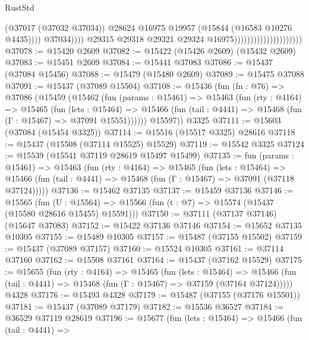\begin{lexlean}{RustStd}
\begin{coremodule}
                                                          (@37017 (@37032 @37034))
                                                          @28624
                                                          @16975
                                                          @19957
                                                          (@15844 (@16583 @10276 @4435))))
                                                      @37034))))
                                              @29315
                                              @29318
                                              @29321
                                              @29324
                                              @16975)))))))))))))))))))))
@37078 := @15420 @2609
@37082 := @15422 (@15426 @2609) (@15432 @2609)
@37083 := @15451 @2609
@37084 := @15441 @37083
@37086 := @15437 (@37084 @15456)
@37088 := @15479 (@15480 @2609)
@37089 := @15475 @37088
@37091 := @15437 (@37089 @15504)
@37108 := @15436
    (fun (fn : @76) =>
    @37086
      (@15459
        (@15462
          (fun (params : @15461) =>
          @15463
            (fun (rty : @4164) =>
            @15465
              (fun (lets : @15464) =>
              @15466 (fun (tail : @4441) => @15468 (fun (Γ : @15467) => @37091 @15551))))))
        @15597))
    @3325
@37111 := @15603 (@37084 (@15454 @3325))
@37114 := @15516 (@15517 @3325) @28616
@37118 := @15437 (@15508 (@37114 @15525) @15529)
@37119 := @15542 @3325
@37124 := @15539 (@15541 @37119 @28619 @15497 @15499)
@37135 := fun (params : @15461) =>
  @15463
    (fun (rty : @4164) =>
    @15465
      (fun (lets : @15464) =>
      @15466 (fun (tail : @4441) => @15468 (fun (Γ : @15467) => @37091 (@37118 @37124)))))
@37136 := @15462 @37135
@37137 := @15459 @37136
@37146 := @15565
    (fun (U : @15564) => @15566 (fun (t : @7) => @15574 (@15437 (@15580 @28616 @15455) @15591)))
@37150 := @37111 (@37137 @37146) (@15647 @37083)
@37152 := @15422 @37136 @37146
@37154 := @15652 @37135 @10305
@37155 := @15489 @10305
@37157 := @15487 (@37155 @15502)
@37159 := @15437 (@37089 @37157)
@37160 := @15524 @10305
@37161 := @37114 @37160
@37162 := @15508 @37161
@37164 := @15437 (@37162 @15529)
@37175 := @15655
    (fun (rty : @4164) =>
    @15465
      (fun (lets : @15464) =>
      @15466 (fun (tail : @4441) => @15468 (fun (Γ : @15467) => @37159 (@37164 @37124)))))
    @4328
@37176 := @15493 @4328
@37179 := @15487 (@37155 (@37176 @15501))
@37181 := @15437 (@37089 @37179)
@37182 := @15536 @36527
@37184 := @36529 @37119 @28619
@37196 := @15677
    (fun (lets : @15464) =>
    @15466
      (fun (tail : @4441) =>

\end{coremodule}
\end{lexlean}

